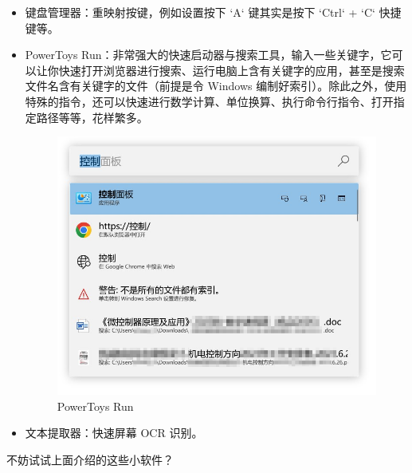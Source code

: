\begin{itemize}
  \item 键盘管理器：重映射按键，例如设置按下 `A` 键其实是按下 `Ctrl` + `C` 快捷键等。
  \item PowerToys Run：非常强大的快速启动器与搜索工具，输入一些关键字，它可以让你快速打开浏览器进行搜索、运行电脑上含有关键字的应用，甚至是搜索文件名含有关键字的文件（前提是令 Windows 编制好索引）。除此之外，使用特殊的指令，还可以快速进行数学计算、单位换算、执行命令行指令、打开指定路径等等，花样繁多。
    \begin{figure}[htb!]
      \centering
      \includegraphics[width=.5\textwidth]{assets/Powertoys_Run.jpg}
      \caption{PowerToys Run}
      \label{PowerToys_Run}
    \end{figure}
  \item 文本提取器：快速屏幕 OCR 识别。
\end{itemize}
\practice

不妨试试上面介绍的这些小软件？